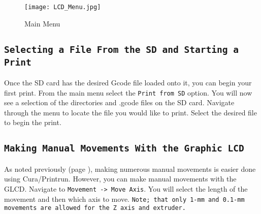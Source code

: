 \begin{figure}[h]
\centering
\texttt{[image: LCD\_Menu.jpg]}
\caption{Main Menu}
\label{fig:main_menu}
\end{figure}



\subsection{\texttt{Selecting a File From the SD and Starting a Print}}
Once the SD card has the desired Gcode file loaded onto it, you can begin your first print. From the main menu select the \texttt{Print from SD} option. You will now see a selection of the directories and .gcode files on the SD card. Navigate through the menu to locate the file you would like to print. Select the desired file to begin the print.


\subsection{\texttt{Making Manual Movements With the Graphic LCD}}
As noted previously (page \pageref{sec:Graphic LCD, Cura or Printrun Host?}), making numerous manual movements is easier done using Cura/Printrun. However, you can make manual movements with the GLCD. Navigate to \texttt{Movement -> Move Axis}. You will select the length of the movement and then which axis to move. \texttt{Note; that only 1-mm and 0.1-mm movements are allowed for the Z axis and extruder.}

